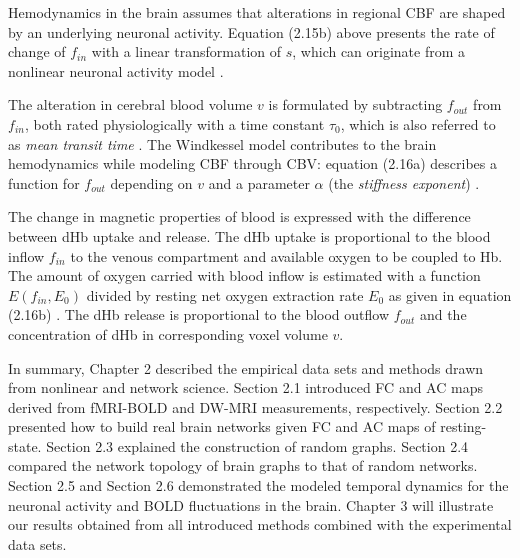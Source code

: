 Hemodynamics in the brain assumes that alterations in regional CBF are shaped by an underlying neuronal activity. Equation (2.15b) above presents the rate of change of $f_{in}$ with a linear transformation of $s$, which can originate from a nonlinear neuronal activity model \citep{XYZ00, XYZFR}. 

The alteration in cerebral blood volume $v$ is formulated by subtracting $f_{out}$ from $f_{in}$, both rated physiologically with a time constant $\tau_0$, which is also referred to as \textit{mean transit time} \citep{XYZ99}. The Windkessel model contributes to the brain hemodynamics while modeling CBF through CBV:  equation (2.16a) describes a function for $f_{out}$ depending on $v$ and a parameter $\alpha$ (the  \textit{stiffness exponent}) \citep{XYZ99}.    

The change in magnetic properties of blood is expressed with the difference between dHb uptake and release. The dHb uptake is proportional to the blood inflow $f_{in}$ to the venous compartment and available oxygen to be coupled to Hb. The amount of oxygen carried with blood inflow is estimated with a function $E(f_{in}, E_0)$ divided by resting net oxygen extraction rate $E_0$ as given in equation (2.16b) \citep{XYZ98}. The dHb release is proportional to the blood outflow $f_{out}$ and the concentration of dHb in corresponding voxel volume $v$.     

In summary, Chapter 2 described the empirical data sets and methods drawn from nonlinear and network science. Section 2.1 introduced FC and AC maps derived from fMRI-BOLD and DW-MRI measurements, respectively. Section 2.2 presented how to build real brain networks given FC and AC maps of resting-state. Section 2.3 explained the construction of random graphs. Section 2.4 compared the network topology of brain graphs to that of random networks. Section 2.5 and Section 2.6 demonstrated the modeled temporal dynamics for the neuronal activity and BOLD fluctuations in the brain. Chapter 3 will illustrate our results obtained from all introduced methods combined with the experimental data sets. 





 
